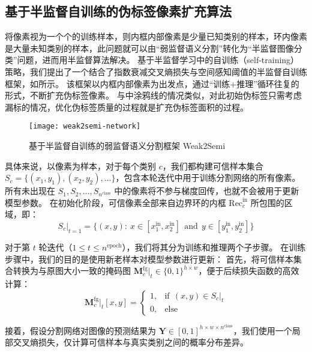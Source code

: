 \subsection{基于半监督自训练的伪标签像素扩充算法}\label{subsec:semi}
将像素视为一个个的训练样本，则内框内部像素是少量已知类别的样本，环内像素是大量未知类别的样本，此问题就可以由“弱监督语义分割”转化为“半监督图像分类”问题，进而用半监督算法解决。
基于半监督学习中的自训练（self-training）策略，我们提出了一个结合了指数衰减交叉熵损失与空间感知阈值的半监督自训练框架，如所示。
该框架以内框内部像素为出发点，通过“训练+推理”循环往复的形式，不断扩充伪标签像素。
与中涂鸦线的情况类似，对此初始伪标签只需考虑漏标的情况，优化伪标签质量的过程就是扩充伪标签面积的过程。
\begin{figure}[h]
\centering
\texttt{[image: weak2semi-network]}
\caption{基于半监督自训练的弱监督语义分割框架 Weak2Semi}
\label{fig:weak2semi-network}
\end{figure}
\par
具体来说，以像素为样本，对于每个类别 $c$，我们都构建可信样本集合 $S_c = \{(x_1,y_1), (x_2,y_2), \dots\}$，包含本轮迭代中用于训练分割网络的所有像素。
所有未出现在 $S_1, S_2, \dots, S_{n^\text{class}}$ 中的像素将不参与梯度回传，也就不会被用于更新模型参数。
在初始化阶段，可信像素全部来自边界环的内框 $\text{Rec}^\text{in}_c$ 所包围的区域，即：
\begin{equation}
S_c \vert_{t=1} = \{(x,y):\ x \in [x_1^\text{in}, x_2^\text{in}]\ \ \text{and}\ \ y \in [y_1^\text{in}, y_2^\text{in}]\}
\end{equation}
\par
对于第 $t$ 轮迭代（$1 \le t \le n^\text{epoch}$），我们将其分为训练和推理两个子步骤。
在训练步骤中，我们的目的是使用新老样本对模型参数进行更新：
首先，将可信样本集合转换为与原图大小一致的掩码图 $\mathbf{M}^\text{fg}_c\vert_t \in \{0,1\}^{h \times w}$，便于后续损失函数的高效计算：
\begin{equation}
\mathbf{M}^\text{fg}_c\vert_{t}[x,y] =
\begin{cases}
1,&\text{if}\ \ (x,y) \in S_c\vert_{t}\\
0,&\text{else}
\end{cases}
\label{eqn:mask-fg}
\end{equation}
\par
接着，假设分割网络对图像的预测结果为 $\mathbf{Y} \in [0,1]^{h \times w \times n^\text{class}}$，我们使用一个局部交叉熵损失，仅计算可信样本与真实类别之间的概率分布差异。
